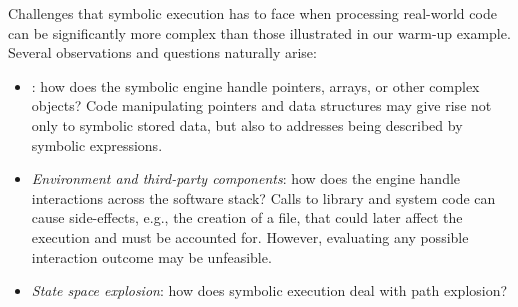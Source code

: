 Challenges that symbolic execution has to face when processing real-world code can be significantly more complex than those illustrated in our warm-up example. Several observations and questions naturally arise:

\begin{itemize}[itemsep=1mm]
\item {}: how does the symbolic engine handle pointers, arrays, or other complex objects? Code manipulating pointers and data structures may give rise not only to symbolic stored data, but also to addresses being described by symbolic expressions.
\item {\em Environment and third-party components}: how does the engine handle interactions across the software stack? Calls to library and system code can cause side-effects, e.g., the creation of a file, that could later affect the execution and must be accounted for. However, evaluating any possible interaction outcome may be unfeasible.
  \item {\em State space explosion}: how does symbolic execution deal with path explosion?

\end{itemize}

